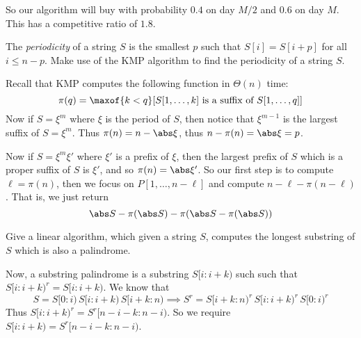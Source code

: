 So our algorithm will buy with probability $0.4$ on day $M/2$ and $0.6$ on day $M$.
This has a competitive ratio of $1.8$.

\bexerc

    The {\it periodicity} of a string $S$ is the smallest $p$ such that $S[i]=S[i+p]$ for all $i\leq n-p$.
    Make use of the KMP algorithm to find the periodicity of a string $S$.

\eexerc

Recall that KMP computes the following function in $\Theta(n)$ time:
$$ \pi(q) = \maxof{k<q}[\hbox{$S[1,\dots,k]$ is a suffix of $S[1,\dots,q]$}] $$
Now if $S=\xi^m$ where $\xi$ is the period of $S$, then notice that $\xi^{m-1}$ is the largest suffix of $S=\xi^m$.
Thus $\pi(n)=n-\abs\xi$, thus $n-\pi(n)=\abs\xi=p$.

Now if $S=\xi^m\xi'$ where $\xi'$ is a prefix of $\xi$, then the largest prefix of $S$ which is a proper suffix of $S$ is $\xi'$, and so $\pi(n)=\abs\xi'$.
So our first step is to compute $\ell=\pi(n)$, then we focus on $P[1,\dots,n-\ell]$ and compute $n-\ell-\pi(n-\ell)$.
That is, we just return
$$ \abs S - \pi(\abs S) - \pi(\abs S-\pi(\abs S)) $$

\bexerc

    Give a linear algorithm, which given a string $S$, computes the longest substring of $S$ which is also a palindrome.

\eexerc

Now, a substring palindrome is a substring $S[i:i+k)$ such such that $S[i:i+k)^r=S[i:i+k)$.
We know that
$$ S = S[0:i)\,S[i:i+k)\,S[i+k:n) \implies S^r = S[i+k:n)^r\,S[i:i+k)^r\,S[0:i)^r $$
Thus $S[i:i+k)^r=S^r[n-i-k:n-i)$.
So we require $S[i:i+k)=S^r[n-i-k:n-i)$.

\bye

